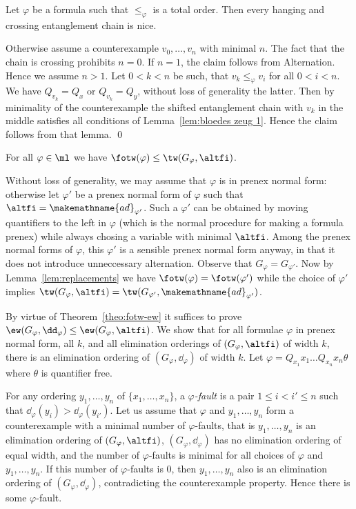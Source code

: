 \documentclass{LMCS}
\newcommand{\gfi}{G_{\varphi}}
\renewcommand{\phi}{\varphi}
\newcommand{\ad}{\dd_{\varphi}}
\newcommand{\alt}{Alternation}
\newcommand{\alte}{\makemathname{ad}}
\begin{document}
\begin{lem}\label{lem:bloedes zeug 2}
Let $\phi$ be a formula such that $\leq_{\phi}$ is a total order. 
Then every hanging and crossing entanglement chain is nice. 
\end{lem}

\proof
Otherwise assume a counterexample $v_0,\ldots,v_n$ with minimal $n$. 
The fact that the chain is crossing prohibits $n=0$. 
If $n=1$, the claim follows from \alt. 
Hence we assume $n>1$. 
Let $0<k<n$ be such, that $v_k\leq_{\phi}v_i$ for all $0<i<n$. 
We have $Q_{v_k}=Q_x$ or $Q_{v_k}=Q_y$, without loss of generality the latter. 
Then by minimality of the counterexample 
the shifted entanglement chain with $v_k$ in the middle 
satisfies all conditions of Lemma~\ref{lem:bloedes zeug 1}. 
Hence the claim follows from that lemma. 
\qed

\begin{thm}\label{thm:fotw und ad}
For all $\phi\in\ml$ we have $\fotw(\phi)\leq\tw(\gfi,\altfi)$. 
\end{thm}

\proof
Without loss of generality, 
we may assume that $\phi$ is in prenex normal form: 
otherwise let $\phi'$ be a prenex normal form of $\phi$ 
such that $\altfi=\alte_{\phi'}$. 
Such a $\phi'$ can be obtained by moving quantifiers to the left in $\phi$ 
(which is the normal procedure for making a formula prenex) 
while always chosing a variable with minimal $\altfi$. 
Among the prenex normal forms of $\phi$, 
this $\phi'$ is a sensible prenex normal form anyway, 
in that it does not introduce unneccessary alternation. 
Observe that $\gfi=G_{\phi'}$. 
Now by Lemma~\ref{lem:replacements} 
we have $\fotw(\phi)=\fotw(\phi')$ 
while the choice of $\phi'$ 
implies $\tw(\gfi,\altfi)=\tw(G_{\phi'},\alte_{\phi'})$. 

By virtue of Theorem~\ref{theo:fotw-ew} it suffices 
to prove $\ew(\gfi,\ad)\leq\ew(\gfi,\altfi)$. 
We show that for all formulae $\phi$ in prenex normal form, all $k$, 
and all elimination orderings of $(\gfi,\altfi)$ of width $k$, 
there is an elimination ordering of $(\gfi,\ad)$ of width $k$. 
Let $\phi=Q_{x_1}x_1\ldots Q_{x_n}x_n\theta$ 
where $\theta$ is quantifier free. 

For any ordering $y_1,\ldots,y_n$ of $\{x_1,\ldots,x_n\}$, 
a \emph{$\phi$-fault} is a pair $1\leq i<i'\leq n$ 
such that $\ad(y_i)>\ad(y_{i'})$. 
Let us assume that $\phi$ and $y_1,\ldots,y_n$ 
form a counterexample with a minimal number of $\phi$-faults, 
that is $y_1,\ldots,y_n$ is an elimination ordering of $(\gfi,\altfi)$, 
$(\gfi,\ad)$ has no elimination ordering of equal width, 
and the number of $\phi$-faults is minimal 
for all choices of $\phi$ and $y_1,\ldots,y_n$. 
If this number of $\phi$-faults is $0$, 
then $y_1,\ldots,y_n$ also is an elimination ordering of $(\gfi,\ad)$, 
contradicting the counterexample property. 
Hence there is some $\phi$-fault. 
\end{document}
